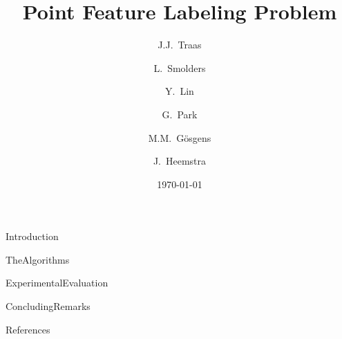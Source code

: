 \documentclass[a4paper,oneside,11pt]{article}
\title{Point Feature Labeling Problem}
\author{J.J.~Traas \and L.~Smolders \and Y.~Lin \and G.~Park \and M.M.~G\"{o}sgens \and J.~Heemstra}
\date{\today}
\begin{document}
\maketitle

{Introduction}

{TheAlgorithms}

{ExperimentalEvaluation}

{ConcludingRemarks}

{References}
\end{document}
